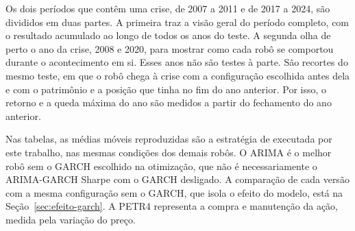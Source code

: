 Os dois períodos que contêm uma crise, de 2007 a 2011 e de 2017 a 2024, são
divididos em duas partes. A primeira traz a visão geral do período completo, com
o resultado acumulado ao longo de todos os anos do teste. A segunda olha de perto
o ano da crise, 2008 e 2020, para mostrar como cada robô se comportou durante o
acontecimento em si. Esses anos não são testes à parte. São recortes do mesmo
teste, em que o robô chega à crise com a configuração escolhida antes dela e com
o patrimônio e a posição que tinha no fim do ano anterior. Por isso, o retorno e
a queda máxima do ano são medidos a partir do fechamento do ano anterior.

Nas tabelas, as médias móveis reproduzidas são a estratégia de
 executada por este trabalho, nas mesmas condições dos
demais robôs. O ARIMA é o melhor robô sem o GARCH escolhido na otimização, que não é
necessariamente o ARIMA-GARCH Sharpe com o GARCH desligado. A comparação de cada versão com a mesma
configuração sem o GARCH, que isola o efeito do modelo, está na
Seção~\ref{sec:efeito-garch}. A PETR4 representa a compra e manutenção da ação,
medida pela variação do preço.

